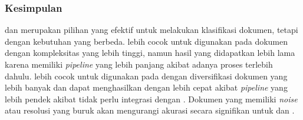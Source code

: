 \subsubsection{Kesimpulan}

\layoutlm{} dan \donut{} merupakan pilihan yang efektif untuk melakukan klasifikasi dokumen, tetapi dengan kebutuhan yang berbeda. \layoutlm{} lebih 
cocok untuk digunakan pada dokumen dengan kompleksitas yang lebih tinggi, namun hasil yang didapatkan lebih lama karena memiliki \textit{pipeline} yang lebih 
panjang akibat adanya proses \ocr{} terlebih dahulu. \donut{} lebih cocok untuk digunakan pada \dataset{} dengan diversifikasi dokumen yang lebih banyak dan dapat menghasilkan dengan lebih cepat akibat \emph{pipeline} yang lebih pendek akibat tidak perlu integrasi dengan \ocr. Dokumen yang memiliki \textit{noise} atau resolusi yang buruk akan mengurangi akurasi secara signifikan untuk \layoutlm{} dan \donut.